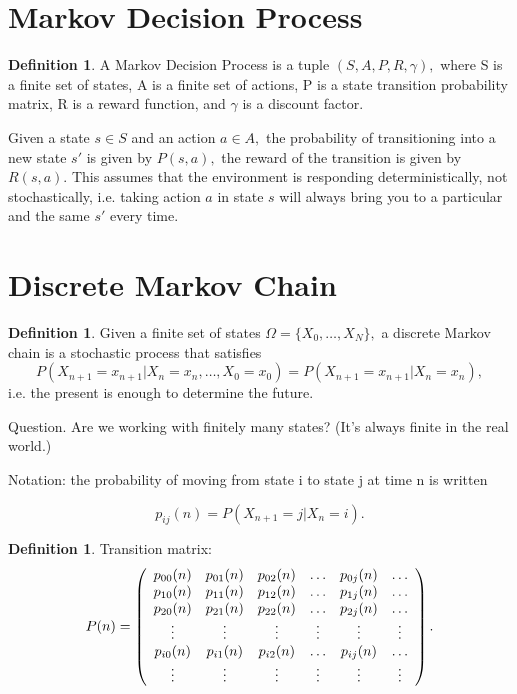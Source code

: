 \documentclass[12pt]{article}
\theoremstyle{plain}
\theoremstyle{definition}
\newtheorem{definition}[theorem]{Definition}
\theoremstyle{remark}
\begin{document}
\section{Markov Decision Process}

\begin{definition}
  A Markov Decision Process is a tuple \( (S, A, P, R, \gamma), \) where S is a finite set of states, A is a finite set of actions, P is a state transition probability matrix, R is a reward function, and \( \gamma \) is a discount factor.
\end{definition}

Given a state \( s \in S \) and an action \( a \in A, \) the probability of
transitioning into a new state \( s' \) is given by \( P(s, a), \) the reward of
the transition is given by \( R(s, a). \) This assumes that the environment is
responding deterministically, not stochastically, i.e. taking action \( a \) in
state \( s \) will always bring you to a particular and the same \( s' \) every
time.

\section{Discrete Markov Chain}

\begin{definition}
  Given a finite set of states \( \Omega = \{ X_0, \ldots, X_N \}, \) a discrete Markov chain is a stochastic process that satisfies
\[
P \left( X _ { n + 1 } = x _ { n + 1 } | X _ { n } = x _ { n } , \ldots , X _ { 0 } = x _ { 0 } \right) = P \left( X _ { n + 1 } = x _ { n + 1 } | X _ { n } = x _ { n } \right),
\]
i.e. the present is enough to determine the future.
\end{definition}

Question. Are we working with finitely many states? (It's always finite in the real world.)

Notation: the probability of moving from state i to state j at time n is written

\[
p _ { i j } ( n ) = P \left( X _ { n + 1 } = j | X _ { n } = i \right).
\]

\begin{definition}
Transition matrix:
\[
P ( n ) = \left(
\begin{array}{ c c c c c c }
{ p _ { 00 } ( n ) } & { p _ { 01 } ( n ) } & { p _ { 02 } ( n ) } & { \dots } & { p _ { 0 j } ( n ) } & { \dots } \\
{ p _ { 10 } ( n ) } & { p _ { 11 } ( n ) } & { p _ { 12 } ( n ) } & { \dots } & { p _ { 1 j } ( n ) } & { \dots } \\
{ p _ { 20 } ( n ) } & { p _ { 21 } ( n ) } & { p _ { 22 } ( n ) } & { \dots } & { p _ { 2 j } ( n ) } & { \dots } \\
{ \vdots } & { \vdots } & { \vdots } & { \vdots } & { \vdots } & { \vdots } \\
{ p _ { i 0 } ( n ) } & { p _ { i 1 } ( n ) } & { p _ { i 2 } ( n ) } & { \dots } & { p _ { i j } ( n ) } & { \dots } \\
{ \vdots } & { \vdots } & { \vdots } & { \vdots } & { \vdots } & { \vdots }
\end{array}
\right).
\]
\end{definition}
\end{document}
